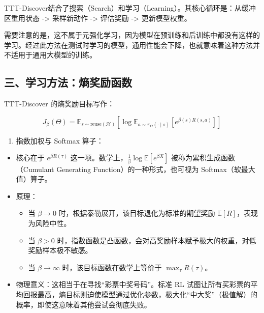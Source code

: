 TTT-Discover结合了搜索（Search）和学习（Learning）。其核心循环是：从缓冲区重用状态 -\textgreater{} 采样新动作 -\textgreater{} 评估奖励 -\textgreater{} 更新模型权重。

需要注意的是，这不属于元强化学习，因为模型在预训练和后训练中都没有这样的学习。经过此方法在测试时学习的模型，通用性能会下降，也就意味着这种方法并不适用于通用大模型的训练。

\hypertarget{ux4e09ux5b66ux4e60ux65b9ux6cd5ux71b5ux5956ux52b1ux51fdux6570}{%
\subsection{三、学习方法：熵奖励函数}\label{ux4e09ux5b66ux4e60ux65b9ux6cd5ux71b5ux5956ux52b1ux51fdux6570}}

TTT-Discover 的熵奖励目标写作：

\[
J_\beta(\Theta) = \mathbb{E}_{s \sim \mathrm{reuse}(\mathcal{H})}\left[\log \mathbb{E}_{a \sim \pi_\Theta(\cdot \mid s)}\left[e^{\beta(s)R(s,a)}\right]\right]
\]

\begin{enumerate}
\def\labelenumi{\arabic{enumi}.}
\tightlist
\item
  指数加权与 Softmax 算子：
\end{enumerate}

\begin{itemize}
\tightlist
\item
  核心在于 \(e^{\beta R(\tau)}\) 这一项。数学上，\(\frac{1}{\beta}\log \mathbb{E}[e^{\beta X}]\) 被称为累积生成函数（Cumulant Generating Function）的一种形式，也可视为 Softmax（软最大值）算子。
\item
  原理：

  \begin{itemize}
  \tightlist
  \item
    当 \(\beta \to 0\) 时，根据泰勒展开，该目标退化为标准的期望奖励 \(\mathbb{E}[R]\)，表现为风险中性。
  \item
    当 \(\beta > 0\) 时，指数函数是凸函数，会对高奖励样本赋予极大的权重，对低奖励样本极不敏感。
  \item
    当 \(\beta \to \infty\) 时，该目标函数在数学上等价于 \(\max_\tau R(\tau)\)。
  \end{itemize}
\item
  物理意义：这相当于在寻找``彩票中奖号码''。标准 RL 试图让所有买彩票的平均回报最高，熵目标则迫使模型通过优化参数，极大化``中大奖''（极值解）的概率，即使这意味着其他尝试会彻底失败。
\end{itemize}

